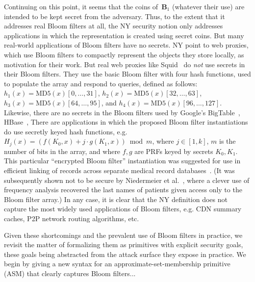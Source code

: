 Continuing on this point, it seems that the coins of~$\mathbf{B}_1$ (whatever their use) are intended to be kept secret from the adversary.  Thus, to the extent that it addresses real Bloom filters at all, the NY security notion only addresses applications in which the representation is created using secret coins.  But many real-world applications of Bloom filters have no secrets.  NY point to web proxies, which use Bloom filters to compactly represent the objects they store locally, as motivation for their work.  But real web proxies like Squid~\cite{xxx} do \emph{not} use secrets in their Bloom filters.  They use the basic Bloom filter with four hash functions, used to populate the array and respond to queries, defined as follows: $h_1(x) = \mathrm{MD5}(x)[0,\ldots,31]$, $h_2(x)=\mathrm{MD5}(x)[32,\ldots,63]$, $h_3(x)=\mathrm{MD5}(x)[64,\ldots,95]$, and $h_4(x)=\mathrm{MD5}(x)[96,\ldots,127]$.  Likewise, there are no secrets in the Bloom filters used by Google's BigTable~\cite{xxx}, HBase~\cite{xxx},   There are applications in which the proposed Bloom filter instantiations do use secretly keyed hash functions, e.g. $H_j(x) = (f(K_0,x) + j\cdot g(K_1,x))\bmod m$, where $j\in[1,k]$, $m$ is the number of bits in the array, and where $f,g$ are PRFs keyed by secrets $K_0,K_1$.  This particular ``encrypted Bloom filter'' instantiation was suggested for use in efficient linking of records across separate medical record databases~\cite{xxx}.  (It was subsequently shown not to be secure by Niedermeier et al.~\cite{xxx}, where a clever use of frequency analysis recovered the last names of patients given access only to the Bloom filter array.)  In any case, it is clear that the NY definition does not capture the most widely used applications of Bloom filters, e.g. CDN summary caches, P2P network routing algorithms, etc.


Given these shortcomings and the prevalent use of Bloom filters in practice, we revisit the matter of formalizing them as primitives with explicit security goals, these goals being abstracted from the attack surface they expose in practice.   We begin by giving a new syntax for an approximate-set-membership primitive (ASM) that clearly captures Bloom filters... 

